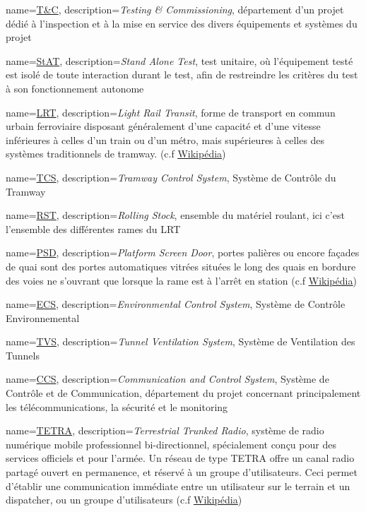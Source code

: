 \usepackage[toc,section=chapter]{glossaries}    %

\makeglossaries

{
	name=\underline{T\&C},
	description={\textit{Testing \& Commissioning}, département d'un projet dédié à l'inspection et à la mise en service des divers équipements et systèmes du projet}
}

{
	name=\underline{StAT},
	description={\textit{Stand Alone Test}, test unitaire, où l'équipement testé est isolé de toute interaction durant le test, afin de restreindre les critères du test à son fonctionnement autonome  }
}

{
	name=\underline{LRT},
	description={\textit{Light Rail Transit}, forme de transport en commun urbain ferroviaire disposant généralement d'une capacité et d'une vitesse inférieures à celles d'un train ou d'un métro, mais supérieures à celles des systèmes traditionnels de tramway. (c.f  \underline{\href{https://fr.wikipedia.org/wiki/Métro_léger}{Wikipédia}})}
	}

{
	name=\underline{TCS},
	description={\textit{Tramway Control System}, Système de Contrôle du Tramway}
}

{
	name=\underline{RST},
	description={\textit{Rolling Stock}, ensemble du matériel roulant, ici c'est l'ensemble des différentes rames du LRT}
}

{
	name=\underline{PSD},
	description={\textit{Platform Screen Door}, portes palières ou encore façades de quai sont des portes automatiques vitrées situées le long des quais en bordure des voies ne s'ouvrant que lorsque la rame est à l'arrêt en station (c.f  \underline{\href{https://fr.wikipedia.org/wiki/Porte_palière_(métro)}{Wikipédia}})}
}

{
	name=\underline{ECS},
	description={\textit{Environmental Control System}, Système de Contrôle Environnemental}
}

{
	name=\underline{TVS},
	description={\textit{Tunnel Ventilation System},  Système de Ventilation des Tunnels }
}

{
	name=\underline{CCS},
	description={\textit{Communication and Control System}, Système de Contrôle et de Communication, département du projet concernant principalement les télécommunications, la sécurité et le monitoring}
}

{
	name=\underline{TETRA},
	description={\textit{Terrestrial Trunked Radio}, système de radio numérique mobile professionnel bi-directionnel, spécialement conçu pour des services officiels et pour l'armée. Un réseau de type TETRA offre un canal radio partagé ouvert en permanence, et réservé à un groupe d'utilisateurs. Ceci permet d'établir une communication immédiate entre un utilisateur sur le terrain et un dispatcher, ou un groupe d'utilisateurs (c.f \underline{\href{https://fr.wikipedia.org/wiki/Terrestrial_Trunked_Radio}{Wikipédia}})}
}


